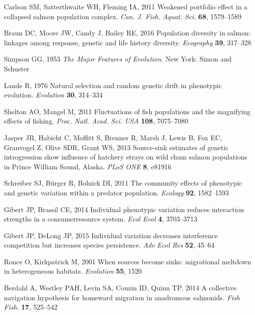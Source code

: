\documentclass{revtex4}
\begin{document}
\begin{thebibliography}{10}
Carlson SM, Satterthwaite WH, Fleming IA, 2011 {Weakened portfolio effect in a
  collapsed salmon population complex}.
\newblock \emph{Can. J. Fish. Aquat. Sci.} \textbf{68}, 1579--1589

Braun DC, Moore JW, Candy J, Bailey RE, 2016 {Population diversity in salmon:
  linkages among response, genetic and life history diversity}.
\newblock \emph{Ecography} \textbf{39}, 317--328

Simpson GG, 1953 \emph{{The Major Features of Evolution}}.
\newblock New York: Simon and Schuster

Lande R, 1976 {Natural selection and random genetic drift in phenotypic
  evolution}.
\newblock \emph{Evolution} \textbf{30}, 314--334

Shelton AO, Mangel M, 2011 {Fluctuations of fish populations and the magnifying
  effects of fishing.}
\newblock \emph{Proc. Natl. Acad. Sci. USA} \textbf{108}, 7075--7080

Jasper JR, Habicht C, Moffitt S, Brenner R, Marsh J, Lewis B, Fox EC, Grauvogel
  Z, Olive SDR, Grant WS, 2013 {Source-sink estimates of genetic introgression
  show influence of hatchery strays on wild chum salmon populations in Prince
  William Sound, Alaska}.
\newblock \emph{PLoS ONE} \textbf{8}, e81916

Schreiber SJ, B{\"u}rger R, Bolnick DI, 2011 {The community effects of
  phenotypic and genetic variation within a predator population.}
\newblock \emph{Ecology} \textbf{92}, 1582--1593

Gibert JP, Brassil CE, 2014 {Individual phenotypic variation reduces
  interaction strengths in a consumer{\textendash}resource system}.
\newblock \emph{Ecol Evol} \textbf{4}, 3703--3713

Gibert JP, DeLong JP, 2015 {Individual variation decreases interference
  competition but increases species persistence}.
\newblock \emph{Adv Ecol Res} \textbf{52}, 45--64

Ronce O, Kirkpatrick M, 2001 {When sources become sinks: migrational meltdown
  in heterogeneous habitats}.
\newblock \emph{Evolution} \textbf{55}, 1520

Berdahl A, Westley PAH, Levin SA, Couzin ID, Quinn TP, 2014 {A collective
  navigation hypothesis for homeward migration in anadromous salmonids}.
\newblock \emph{Fish Fish.} \textbf{17}, 525--542


\end{thebibliography}
\end{document}
